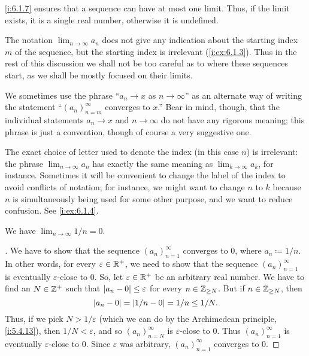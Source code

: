 \begin{note}
  \cref{i:6.1.7} ensures that a sequence can have at most one limit.
  Thus, if the limit exists, it is a single real number, otherwise it is undefined.
\end{note}

\begin{rmk}\label{i:6.1.9}
  The notation \(\lim_{n \to \infty} a_n\) does not give any indication about the starting index \(m\) of the sequence, but the starting index is irrelevant (\cref{i:ex:6.1.3}).
  Thus in the rest of this discussion we shall not be too careful as to where these sequences start, as we shall be mostly focused on their limits.
\end{rmk}

\begin{note}
  We sometimes use the phrase ``\(a_n \to x\) as \(n \to \infty\)'' as an alternate way of writing the statement ``\((a_n)_{n = m}^\infty\) converges to \(x\).''
  Bear in mind, though, that the individual statements \(a_n \to x\) and \(n \to \infty\) do not have any rigorous meaning;
  this phrase is just a convention, though of course a very suggestive one.
\end{note}

\begin{rmk}\label{i:6.1.10}
  The exact choice of letter used to denote the index (in this case \(n\)) is irrelevant:
  the phrase \(\lim_{n \to \infty} a_n\) has exactly the same meaning as \(\lim_{k \to \infty} a_k\), for instance.
  Sometimes it will be convenient to change the label of the index to avoid conflicts of notation;
  for instance, we might want to change \(n\) to \(k\) because \(n\) is simultaneously being used for some other purpose, and we want to reduce confusion.
  See \cref{i:ex:6.1.4}.
\end{rmk}

\begin{prop}\label{i:6.1.11}
  We have \(\lim_{n \to \infty} 1 / n = 0\).
\end{prop}

\begin{proof}[]
  We have to show that the sequence \((a_n)_{n = 1}^\infty\) converges to \(0\), where \(a_n \coloneqq 1 / n\).
  In other words, for every \(\varepsilon \in \mathbb{R}^+\), we need to show that the sequence \((a_n)_{n = 1}^\infty\) is eventually \(\varepsilon\)-close to \(0\).
  So, let \(\varepsilon \in \mathbb{R}^+\) be an arbitrary real number.
  We have to find an \(N \in \mathbb{Z}^+\) such that \(\left\lvert a_n - 0\right\rvert \leq \varepsilon\) for every \(n \in \mathbb{Z}_{\geq N}\).
  But if \(n \in \mathbb{Z}_{\geq N}\), then
  \[
    \left\lvert a_n - 0\right\rvert = \left\lvert1 / n - 0\right\rvert = 1 / n \leq 1 / N.
  \]
  Thus, if we pick \(N > 1 / \varepsilon\) (which we can do by the Archimedean principle, \cref{i:5.4.13}), then \(1 / N < \varepsilon\), and so \((a_n)_{n = N}^\infty\) is \(\varepsilon\)-close to \(0\).
  Thus \((a_n)_{n = 1}^\infty\) is eventually \(\varepsilon\)-close to \(0\).
  Since \(\varepsilon\) was arbitrary, \((a_n)_{n = 1}^\infty\) converges to \(0\).
\end{proof}


